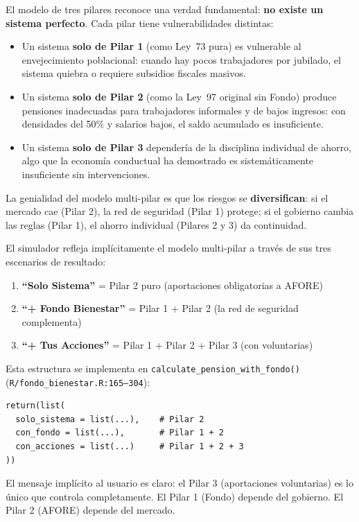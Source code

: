 \documentclass[11pt,a4paper]{report}
\begin{document}
\begin{tcolorbox}[colback=green!5!white, colframe=green!50!black, title=\textbf{Intuici\'on: Ning\'un Pilar Solo es Suficiente}]
El modelo de tres pilares reconoce una verdad fundamental: \textbf{no existe un sistema perfecto}. Cada pilar tiene vulnerabilidades distintas:

\begin{itemize}
  \item Un sistema \textbf{solo de Pilar 1} (como Ley~73 pura) es vulnerable al envejecimiento poblacional: cuando hay pocos trabajadores por jubilado, el sistema quiebra o requiere subsidios fiscales masivos.

  \item Un sistema \textbf{solo de Pilar 2} (como la Ley~97 original sin Fondo) produce pensiones inadecuadas para trabajadores informales y de bajos ingresos: con densidades del 50\% y salarios bajos, el saldo acumulado es insuficiente.

  \item Un sistema \textbf{solo de Pilar 3} depender\'ia de la disciplina individual de ahorro, algo que la econom\'ia conductual ha demostrado es sistem\'aticamente insuficiente sin intervenciones.
\end{itemize}

La genialidad del modelo multi-pilar es que los riesgos se \textbf{diversifican}: si el mercado cae (Pilar 2), la red de seguridad (Pilar 1) protege; si el gobierno cambia las reglas (Pilar 1), el ahorro individual (Pilares 2 y 3) da continuidad.
\end{tcolorbox}

\begin{tcolorbox}[colback=orange!5!white, colframe=orange!75!black, title=\textbf{Aplicaci\'on en C\'odigo: Los Tres Escenarios del Simulador}, breakable]
El simulador refleja impl\'icitamente el modelo multi-pilar a trav\'es de sus tres escenarios de resultado:

\begin{enumerate}
  \item \textbf{``Solo Sistema''} = Pilar 2 puro (aportaciones obligatorias a AFORE)
  \item \textbf{``+ Fondo Bienestar''} = Pilar 1 + Pilar 2 (la red de seguridad complementa)
  \item \textbf{``+ Tus Acciones''} = Pilar 1 + Pilar 2 + Pilar 3 (con voluntarias)
\end{enumerate}

Esta estructura se implementa en \texttt{calculate\_pension\_with\_fondo()} (\texttt{R/fondo\_bienestar.R:165--304}):

\begin{lstlisting}[caption={Los tres escenarios como pilares}]
return(list(
  solo_sistema = list(...),    # Pilar 2
  con_fondo = list(...),       # Pilar 1 + 2
  con_acciones = list(...)     # Pilar 1 + 2 + 3
))
\end{lstlisting}

El mensaje impl\'icito al usuario es claro: el Pilar 3 (aportaciones voluntarias) es lo \'unico que controla completamente. El Pilar 1 (Fondo) depende del gobierno. El Pilar 2 (AFORE) depende del mercado.
\end{tcolorbox}
\end{document}
